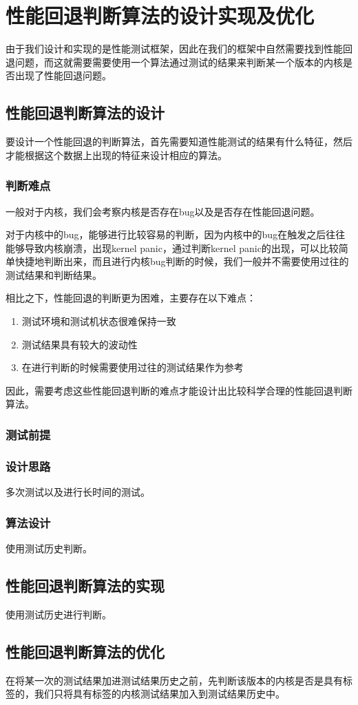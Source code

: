 

\chapter{性能回退判断算法的设计实现及优化}
由于我们设计和实现的是性能测试框架，因此在我们的框架中自然需要找到性能回退问题，而这就需要需要使用一个算法通过测试的结果来判断某一个版本的内核是否出现了性能回退问题。


\section{性能回退判断算法的设计}
要设计一个性能回退的判断算法，首先需要知道性能测试的结果有什么特征，然后才能根据这个数据上出现的特征来设计相应的算法。

\subsection{判断难点}
一般对于内核，我们会考察内核是否存在bug以及是否存在性能回退问题。

对于内核中的bug，能够进行比较容易的判断，因为内核中的bug在触发之后往往能够导致内核崩溃，出现kernel panic，通过判断kernel panic的出现，可以比较简单快捷地判断出来，而且进行内核bug判断的时候，我们一般并不需要使用过往的测试结果和判断结果。

相比之下，性能回退的判断更为困难，主要存在以下难点：
\begin{enumerate}
\item 测试环境和测试机状态很难保持一致
\item 测试结果具有较大的波动性
\item 在进行判断的时候需要使用过往的测试结果作为参考
\end{enumerate}

因此，需要考虑这些性能回退判断的难点才能设计出比较科学合理的性能回退判断算法。
\subsection{测试前提}

\subsection{设计思路}
多次测试以及进行长时间的测试。
\subsection{算法设计}
使用测试历史判断。
\section{性能回退判断算法的实现}
使用测试历史进行判断。

\section{性能回退判断算法的优化}
在将某一次的测试结果加进测试结果历史之前，先判断该版本的内核是否是具有标签的，我们只将具有标签的内核测试结果加入到测试结果历史中。